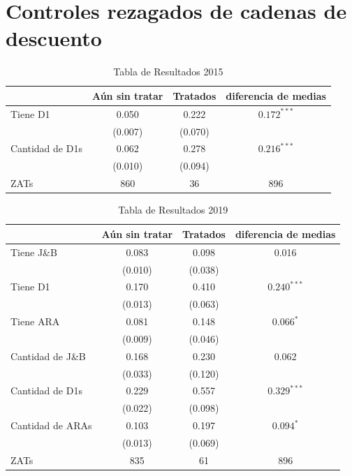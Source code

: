 \documentclass{article}
\begin{document}
\section{Controles rezagados de cadenas de descuento}

\begin{table} [H]
  \centering
  \caption{Tabla de Resultados 2015}
  \label{tab:d1}
  \begin{tabular}{l c c c}
    \toprule
    & \textbf{Aún sin tratar} & \textbf{Tratados} & \textbf{diferencia de medias} \\
    \midrule
    Tiene D1 & 0.050 & 0.222 & $0.172^{***}$ \\
    & (0.007) & (0.070) & \\
    \midrule
    Cantidad de D1s & 0.062 & 0.278 & $0.216^{***}$ \\
    & (0.010) & (0.094) & \\
    \midrule
    ZATs & 860 & 36 & 896 \\
    \bottomrule
  \end{tabular}
\end{table}

\begin{table} [H]
  \centering
  \caption{Tabla de Resultados 2019}
  \label{tab:d1_jb_ara}
  \begin{tabular}{l c c c}
    \toprule
    & \textbf{Aún sin tratar} & \textbf{Tratados} & \textbf{diferencia de medias} \\
    \midrule
    Tiene J\&B & 0.083 & 0.098 & 0.016 \\
    & (0.010) & (0.038) & \\
    Tiene D1 & 0.170 & 0.410 & $0.240^{***}$ \\
    & (0.013) & (0.063) & \\
    Tiene ARA & 0.081 & 0.148 & $0.066^{*}$ \\
    & (0.009) & (0.046) & \\
    Cantidad de J\&B & 0.168 & 0.230 & 0.062 \\
    & (0.033) & (0.120) & \\
    Cantidad de D1s & 0.229 & 0.557 & $0.329^{***}$ \\
    & (0.022) & (0.098) & \\
    Cantidad de ARAs & 0.103 & 0.197 & $0.094^{*}$ \\
    & (0.013) & (0.069) & \\
    \midrule
    ZATs & 835 & 61 & 896 \\
    \bottomrule
  \end{tabular}
\end{table}
\end{document}
